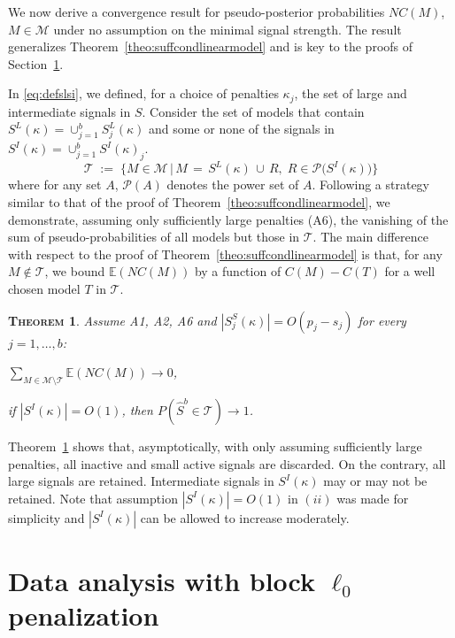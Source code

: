\documentclass[aos]{imsart}
\theoremstyle{plain}
\newtheorem{thm}{\textsc{Theorem}}[section]
\newcommand{\E}{\mathbb{E}}
\newcommand{\M}{\mathcal{M}}
\newcommand{\T}{\mathcal{T}}
\begin{document}
We now derive a convergence result for pseudo-posterior probabilities $NC(M)$, $M\in\mathcal{M}$ under no assumption on the minimal signal strength. The result generalizes Theorem~\ref{theo:suffcondlinearmodel} and is key to the proofs of Section~\ref{sec:informed_l0}.

In \eqref{eq:defslsi}, we defined, for a choice of penalties $\kappa_j$, the set of large and intermediate signals in $S$. Consider the set of models that contain $S^L(\kappa)=\cup_{j=1}^b S^{L}_j(\kappa)$ and some or none of the signals in $S^{I}(\kappa)=\cup_{j=1}^b S^{I}(\kappa)_j$.
\begin{equation}
    \T \;:=\;\Big\{M \in \M \,\big|\, M\,=\, S^L(\kappa)\,\cup\,R,\; R\in \mathcal{P}\big(S^{I}(\kappa)\big)  \Big\}
\end{equation}
where for any set $A$, $ \mathcal{P}(A)$ denotes the power set of $A$.
Following a strategy similar to that of the proof of Theorem~\ref{theo:suffcondlinearmodel}, we demonstrate, assuming only sufficiently large penalties (A6), the vanishing of the sum of pseudo-probabilities of all models but those in $\T$. The main difference with respect to the proof of Theorem~\ref{theo:suffcondlinearmodel} is that, for any $M\not\in \T$, we bound $\E(NC(M))$ by a function of $C(M)-C(T)$ for a well chosen model $T$ in $\T$. 
\begin{thm}\label{thm:convtoT}
    Assume A1, A2, A6 and $|S^{S}_j(\kappa)|=O(p_j-s_j)$ for every $j=1,\ldots,b$:
    \begin{longlist}
        \item $\sum_{M \in \M\setminus \T} \E\left(NC(M)\right)\to 0$,
        \item if $|S^{I}(\kappa)|=O(1)$, then $P(\hat{S}^b \in \T)\to 1$.
    \end{longlist}
\end{thm}
Theorem~\ref{thm:convtoT} shows that, asymptotically, with only assuming sufficiently large penalties, all inactive and small active signals are discarded. On the contrary, all large signals are retained. Intermediate signals in $S^{I}(\kappa)$ may or may not be retained. Note that assumption $|S^{I}(\kappa)|=O(1)$ in $(ii)$ was made for simplicity and $|S^{I}(\kappa)|$ can be allowed to increase moderately. 

\section{Data analysis with block $\ell_0$ penalization}\label{sec:informed_l0}
\end{document}
